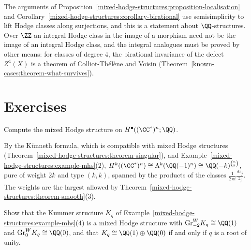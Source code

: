 \begin{remark}\label{mixed-hodge-structures:remark-integral}
The arguments of Proposition~\ref{mixed-hodge-structures:proposition-localisation} and Corollary~\ref{mixed-hodge-structures:corollary-birational} use semisimplicity to lift Hodge classes along surjections,
and this is a statement about $\QQ$-structures. Over $\ZZ$ an integral Hodge class in the image of a morphism need not be the image of an integral Hodge class, and the integral analogues must be proved
by other means: for classes of degree $4$, the birational invariance of the defect $Z^4(X)$ is a theorem of Colliot-Th\'el\`ene and Voisin (Theorem~\ref{known-cases:theorem-what-survives}).
\end{remark}

\section{Exercises}\label{mixed-hodge-structures:section-exercises}

\begin{exercise}\label{mixed-hodge-structures:exercise-cstar}
Compute the mixed Hodge structure on $H^\bullet((\CC^*)^n; \QQ)$.
\end{exercise}

\begin{solution}
By the K\"unneth formula, which is compatible with mixed Hodge structures (Theorem~\ref{mixed-hodge-structures:theorem-singular}), and Example~\ref{mixed-hodge-structures:example-mhs}(2),
$H^k((\CC^*)^n) \cong \Lambda^k(\QQ(-1)^n) \cong \QQ(-k)^{\binom{n}{k}}$, pure of weight $2k$ and type $(k,k)$, spanned by the products of the classes $\frac{1}{2\pi i}\frac{dz_j}{z_j}$. The weights are the largest
allowed by Theorem~\ref{mixed-hodge-structures:theorem-smooth}(3).
\end{solution}

\begin{exercise}\label{mixed-hodge-structures:exercise-kummer}
Show that the Kummer structure $K_q$ of Example~\ref{mixed-hodge-structures:example-mhs}(4) is a mixed Hodge structure with $\mathrm{Gr}^W_{-2}K_q \cong \QQ(1)$ and $\mathrm{Gr}^W_0K_q \cong \QQ(0)$, and that
$K_q \cong \QQ(1) \oplus \QQ(0)$ if and only if $q$ is a root of unity.
\end{exercise}

